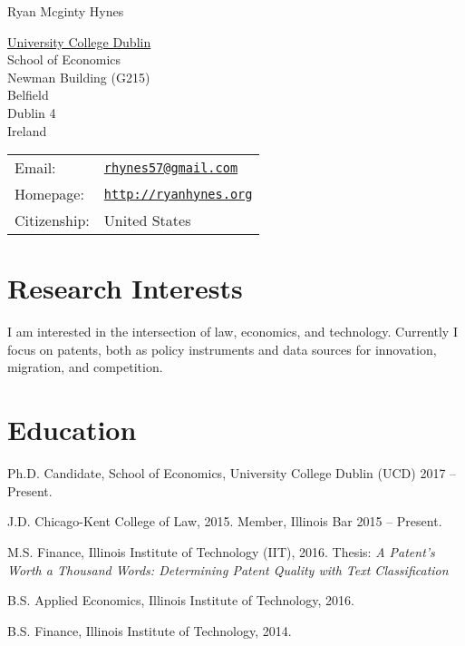 \documentclass[letterpaper]{article}
\def\name{Ryan Mcginty Hynes}
\renewenvironment{itemize}{
  \begin{list}{}{
    \setlength{\leftmargin}{1.5em}
  }
}{
  \end{list}
}
\begin{document}
{\huge \name}


\vspace{0.25in}

\begin{minipage}{0.45\linewidth}
  \href{http://http://www.ucd.ie/economics/}{University College Dublin} \\
  School of Economics \\
 Newman Building (G215) \\
 Belfield\\
 Dublin 4\\
 Ireland\\
 
\end{minipage}
\begin{minipage}{0.45\linewidth}
  \begin{tabular}{ll}
    Email: & \href{mailto:rhynes57@gmail.com}{\tt rhynes57@gmail.com} \\
    Homepage: & \href{http://ryanhynes.org}{\tt http://ryanhynes.org} \\
    Citizenship: & United States \\
  \end{tabular}
\end{minipage}

\section*{Research Interests}
\begin{itemize}
\item I am interested in the intersection of law, economics, and technology. Currently I focus on patents, both as policy instruments and data sources for innovation, migration, and competition. 
\end{itemize} 

\section*{Education}

\begin{itemize}
  \item Ph.D. Candidate, School of Economics, University College Dublin (UCD) 2017 -- Present.
  \item J.D. Chicago-Kent College of Law, 2015.
  \subitem Member, Illinois Bar 2015 -- Present.
  \item M.S. Finance, Illinois Institute of Technology (IIT), 2016.
  	\subitem Thesis: \emph{A Patent's Worth a Thousand Words:
Determining Patent Quality with Text
Classification}
  \item B.S. Applied Economics, Illinois Institute of Technology, 2016.
  \item B.S. Finance, Illinois Institute of Technology, 2014.  
\end{itemize}
\end{document}
